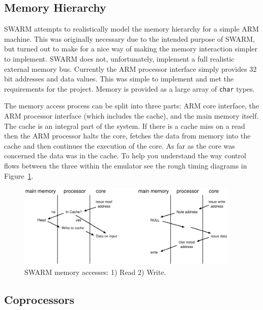\documentclass[10pt,a4paper]{article}
\begin{document}
\subsection{Memory Hierarchy} %
\label{sec:memory}            %

SWARM attempts to realistically model the memory hierarchy for a
simple ARM machine. This was originally necessary due to the intended
purpose of SWARM, but turned out to make for a nice way of making the
memory interaction simpler to implement. SWARM does not,
unfortunately, implement a full realistic external memory bus. 
Currently the ARM processor interface simply provides 32 bit addresses
and data values. This was simple to implement and met the
requirements for the project. Memory is provided as a large array of
\texttt{char} types.

The memory access process can be split into three parts: ARM core
interface, the ARM processor interface (which includes the cache), and
the main memory itself. The cache is an integral part of the
system. If there is a cache miss on a read then the ARM processor
halts the core, fetches the data from memory into the cache and then
continues the execution of the core. As far as the core was concerned
the data was in the cache.
To help you understand the way control flows between the three within
the emulator see the rough timing diagrams in Figure~\ref{fig:memory}. 

\begin{figure}
\centering
\mbox{\includegraphics[height=4cm]{pics/mem}}
\caption{SWARM memory accesses: 1) Read 2) Write.}
\label{fig:memory}
\end{figure}


\subsection{Coprocessors} %
\label{sec:copro}         %
\end{document}
